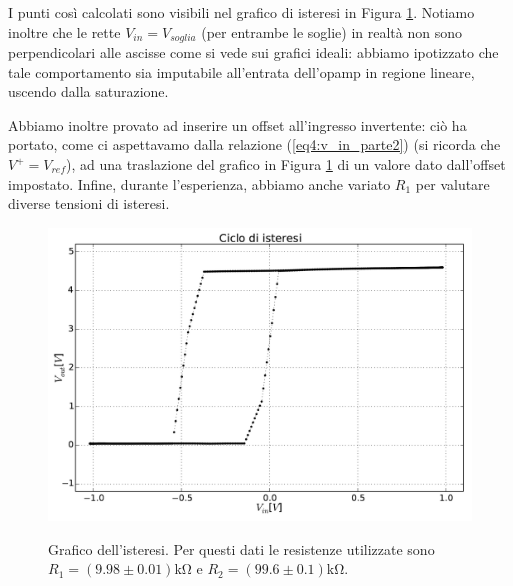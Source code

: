 I punti così calcolati sono visibili nel grafico di isteresi in Figura \ref{gr4:isteresi}. Notiamo inoltre che le rette $V_{in}=V_{soglia}$ (per entrambe le soglie) in realtà non sono perpendicolari alle ascisse come si vede sui grafici ideali: abbiamo ipotizzato che tale comportamento sia imputabile all'entrata dell'opamp in regione lineare, uscendo dalla saturazione.

Abbiamo inoltre provato ad inserire un offset all'ingresso invertente: ciò ha portato, come ci aspettavamo dalla relazione (\ref{eq4:v_in_parte2}) (si ricorda che $V^+=V_{ref}$), ad una traslazione del grafico in Figura \ref{gr4:isteresi} di un valore dato dall'offset impostato. Infine, durante l'esperienza, abbiamo anche variato $R_1$ per valutare diverse tensioni di isteresi.

\begin{figure}[ht]
 \centering
   {\includegraphics[width=14.5cm]{../E04/latex/XY.pdf}}
 \caption{Grafico dell'isteresi. Per questi dati le resistenze utilizzate sono $R_1=(9.98 \pm 0.01)$\si{\kilo\ohm} e $R_2=(99.6 \pm 0.1)$\si{\kilo\ohm}.}
 \label{gr4:isteresi}
\end{figure}